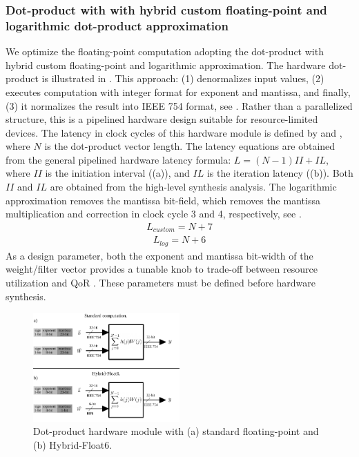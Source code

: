 \subsubsection{\textbf{Dot-product with with hybrid custom
		floating-point and logarithmic
		dot-product approximation}}
\label{sec:dot_product}
We optimize the floating-point computation adopting the dot-product with hybrid custom floating-point and logarithmic approximation\cite{nevarez2021accelerating}. The hardware dot-product is illustrated in . This approach: (1) denormalizes input values, (2) executes computation with integer format for exponent and mantissa, and finally, (3) it normalizes the result into IEEE 754 format, see . Rather than a parallelized structure, this is a pipelined hardware design suitable for resource-limited devices. The latency in clock cycles of this hardware module is defined by  and , where $N$ is the dot-product vector length. The latency equations are obtained from the general pipelined hardware latency formula: $L=\left(N-1\right)II+IL$, where $II$ is the initiation interval ((a)), and $IL$ is the iteration latency ((b)). Both $II$ and $IL$ are obtained from the high-level synthesis analysis. The logarithmic approximation removes the mantissa bit-field, which removes the mantissa multiplication and correction in clock cycle 3 and 4, respectively, see .
\begin{eqnarray} \label{eq:dot_custom_float_latency}
L_{custom}=N+7
\end{eqnarray}
\begin{eqnarray} \label{eq:dot_log_latency}
L_{log}=N+6
\end{eqnarray}
 As a design parameter, both the exponent and mantissa bit-width of the weight/filter vector provides a tunable knob to trade-off between resource utilization and QoR \cite{park2009dynamic}. These parameters must be defined before hardware synthesis.
\begin{figure}[t!]
	\centering
	\includegraphics[width=0.5\textwidth]{../figures/dot-product_unit.pdf}
	\caption{Dot-product hardware module with (a) standard floating-point and (b) Hybrid-Float6.}
	\label{fig:dot_product}
\end{figure}
